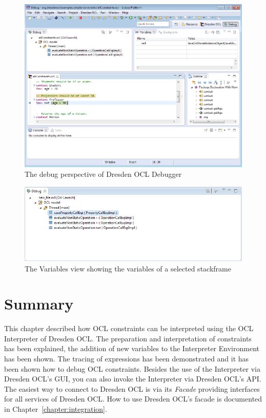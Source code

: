 \begin{figure}[tbp]
	\centering
	\includegraphics[width=\textwidth,height=\textheight,keepaspectratio]{figures/interpreter/debug05}
  \caption{The debug perspective of Dresden OCL Debugger}
  \label{pic:interpreter:debug05}
\end{figure}

\begin{figure}[tbp]
	\centering
	\includegraphics[width=\textwidth,height=\textheight,keepaspectratio]{figures/interpreter/debug06}
  \caption{The Variables view showing the variables of a selected stackframe}
  \label{pic:interpret:debug06}
\end{figure}

\section{Summary}
  
This chapter described how \acs{OCL} constraints can be interpreted using the 
\acs{OCL} Interpreter of Dresden OCL. The preparation and interpretation of 
constraints has been explained, the addition of new variables to the 
Interpreter Environment has been shown. The tracing of expressions has been
demonstrated and it has been shown how to debug \acs{OCL} constraints. Besides
the use of the Interpreter via Dresden OCL's GUI, you can also invoke the
Interpreter via Dresden OCL's \acs{API}. The easiest way to connect to Dresden
OCL is via its \emph{Facade} providing interfaces for all services of Dresden
OCL. How to use Dresden OCL's facade is documented in
Chapter~\ref{chapter:integration}.
